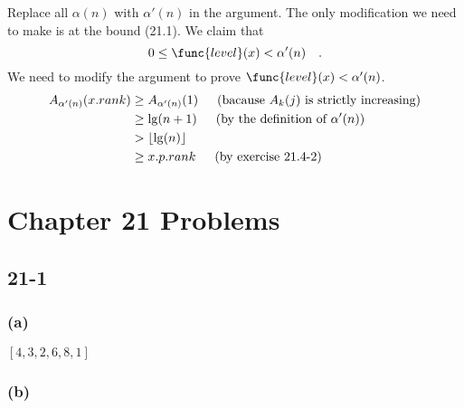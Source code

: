 Replace all $\alpha(n)$ with $\alpha'(n)$ in the argument.
The only modification we need to make is at the bound (21.1).
We claim that
\begin{equation*}
    0 \leq \func{level}(x) < \alpha'(n) \quad.
\end{equation*}
We need to modify the argument to prove $\func{level}(x) < \alpha'(n)$.
\begin{equation*}
\begin{split}
    A_{\alpha'(n)}(x.rank) & \geq A_{\alpha'(n)}(1)
    \text{\indent(bacause $A_k(j)$ is strictly increasing)} \\
    & \geq \lg (n + 1) 
    \text{\indent(by the definition of $\alpha'(n)$)} \\
    & > \lfloor \lg(n) \rfloor \\
    & \geq x.p.rank
    \text{\indent(by exercise 21.4-2)} \\
\end{split}
\end{equation*}

\section*{Chapter 21 Problems}

\subsection*{21-1}

\subsubsection*{(a)}

$[ 4, 3, 2, 6, 8, 1 ]$

\subsubsection*{(b)}

